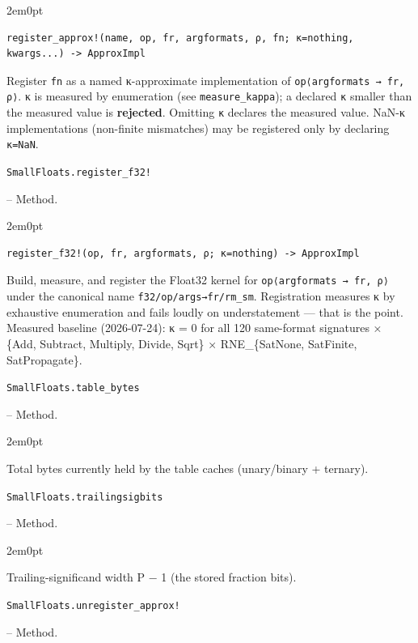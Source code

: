 \begin{adjustwidth}{2em}{0pt}


\begin{verbatim}
register_approx!(name, op, fr, argformats, ρ, fn; κ=nothing, kwargs...) -> ApproxImpl
\end{verbatim}

Register \texttt{fn} as a named κ-approximate implementation of \texttt{op⟨argformats → fr, ρ⟩}. κ is measured by enumeration (see \texttt{measure\_kappa}); a declared \texttt{κ} smaller than the measured value is \textbf{rejected}. Omitting \texttt{κ} declares the measured value. NaN-κ implementations (non-finite mismatches) may be registered only by declaring \texttt{κ=NaN}.



\end{adjustwidth}
\hypertarget{11323396924847339952}{\texttt{SmallFloats.register\_f32!}}  -- {Method.}

\begin{adjustwidth}{2em}{0pt}


\begin{verbatim}
register_f32!(op, fr, argformats, ρ; κ=nothing) -> ApproxImpl
\end{verbatim}

Build, measure, and register the Float32 kernel for \texttt{op⟨argformats → fr, ρ⟩} under the canonical name \texttt{f32/op/args→fr/rm\_sm}. Registration measures κ by exhaustive enumeration and fails loudly on understatement — that is the point. Measured baseline (2026-07-24): κ = 0 for all 120 same-format signatures × \{Add, Subtract, Multiply, Divide, Sqrt\} × RNE\_\{SatNone, SatFinite, SatPropagate\}.



\end{adjustwidth}
\hypertarget{10680873580113776002}{\texttt{SmallFloats.table\_bytes}}  -- {Method.}

\begin{adjustwidth}{2em}{0pt}

Total bytes currently held by the table caches (unary/binary + ternary).



\end{adjustwidth}
\hypertarget{13844074395020045017}{\texttt{SmallFloats.trailingsigbits}}  -- {Method.}

\begin{adjustwidth}{2em}{0pt}

Trailing-significand width P − 1 (the stored fraction bits).



\end{adjustwidth}
\hypertarget{12365808433851041199}{\texttt{SmallFloats.unregister\_approx!}}  -- {Method.}


